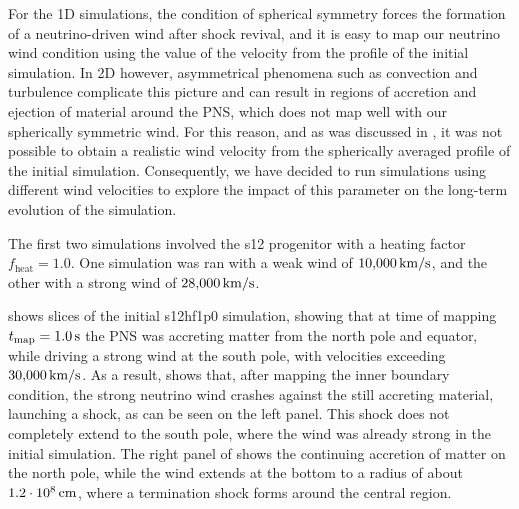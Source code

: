 For the 1D simulations, the condition of spherical symmetry forces the formation of a neutrino-driven wind after shock revival, and it is easy to map our neutrino wind condition using the value of the velocity from the profile of the initial simulation. In 2D however, asymmetrical phenomena such as convection and turbulence complicate this picture and can result in regions of accretion and ejection of material around the PNS, which does not map well with our spherically symmetric wind. For this reason, and as was discussed in , it was not possible to obtain a realistic wind velocity from the spherically averaged profile of the initial simulation. Consequently, we have decided to run simulations using different wind velocities to explore the impact of this parameter on the long-term evolution of the simulation.

The first two simulations involved the s12 progenitor with a heating factor \(f_\mathrm{heat} = 1.0\). One simulation was ran with a weak wind of \(10{,}000\,\mathrm{km/s}\), and the other with a strong wind of \(28{,}000\,\mathrm{km/s}\).

 shows slices of the initial s12hf1p0 simulation, showing that at time of mapping \(t_\mathrm{map} = 1.0\,\mathrm{s}\) the PNS was accreting matter from the north pole and equator, while driving a strong wind at the south pole, with velocities exceeding \(30{,}000\,\mathrm{km/s}\). As a result,  shows that, after mapping the inner boundary condition, the strong neutrino wind crashes against the still accreting material, launching a shock, as can be seen on the left panel. This shock does not completely extend to the south pole, where the wind was already strong in the initial simulation. The right panel of  shows the continuing accretion of matter on the north pole, while the wind extends at the bottom to a radius of about \(1.2\cdot10^8\,\mathrm{cm}\), where a termination shock forms around the central region.

